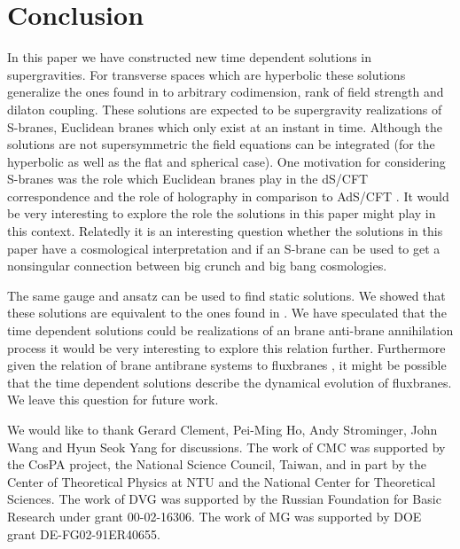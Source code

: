 \documentclass[a4paper,aps,nofootinbib,showpacs,preprint]{revtex4}
\begin{document}
\section{Conclusion}
In this paper we have constructed new time dependent solutions in
supergravities. For transverse spaces which are hyperbolic these
solutions generalize the ones found in \cite{GS02} to arbitrary
codimension, rank of field strength and dilaton coupling. These
solutions are expected to be supergravity realizations of
S-branes, Euclidean branes which only exist at an instant in
time. Although the solutions are not supersymmetric the field
equations can be integrated (for the hyperbolic as well as the
flat and spherical case). One motivation for considering S-branes
was the role which Euclidean branes play in the dS/CFT
correspondence and the role of holography in comparison to AdS/CFT
\cite{Ma98,GKP98,Wi98,AGMOO99}. It would be very interesting to
explore the role the solutions in this paper might play in this
context. Relatedly it is an interesting question whether the
solutions in this paper have a cosmological interpretation and if
an S-brane can be used to get a nonsingular connection between big
crunch and big bang cosmologies.

The same gauge and ansatz can be used to find static solutions. We
showed that these solutions are equivalent to the ones found in
\cite{ZZ99,BMO01}. We have speculated that the time dependent
solutions could be realizations of an brane anti-brane
annihilation process it would be very interesting to explore this
relation further. Furthermore given the relation of brane
antibrane systems to fluxbranes \cite{Me64,GM88,GW87,DGGH95,Ts95,
DGGH96,RuTs96,CG00,CGS99,Sa01,GS01,CHC01,CGS02,Iv02}, it might be
possible that the time dependent solutions describe the dynamical
evolution of fluxbranes. We leave this question for future work.


\begin{acknowledgments}
We would like to thank Gerard Clement, Pei-Ming Ho, Andy
Strominger, John Wang and Hyun Seok Yang for discussions. The
work of CMC was supported by the CosPA project, the National
Science Council, Taiwan, and in part by the Center of Theoretical
Physics at NTU and the National Center for Theoretical Sciences.
The work of DVG was supported by the Russian Foundation for Basic
Research under grant 00-02-16306. The work of MG was supported by
DOE grant DE-FG02-91ER40655.
\end{acknowledgments}
\end{document}
